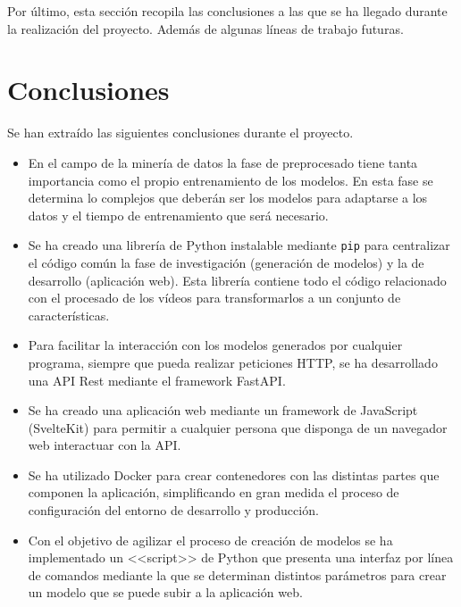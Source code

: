 \label{cha:Conclusiones y Líneas de trabajo futuras}

Por último, esta sección recopila las conclusiones a las que se ha llegado
durante la realización del proyecto. Además de algunas líneas de trabajo
futuras.

\section{Conclusiones}

Se han extraído las siguientes conclusiones durante el proyecto.

\begin{itemize}
    \item En el campo de la minería de datos la fase de preprocesado tiene tanta
    importancia como el propio entrenamiento de los modelos. En esta fase se
    determina lo complejos que deberán ser los modelos para adaptarse a los
    datos y el tiempo de entrenamiento que será necesario.
    \item Se ha creado una librería de Python instalable mediante \texttt{pip}
    para centralizar el código común la fase de investigación (generación de
    modelos) y la de desarrollo (aplicación web). Esta librería contiene todo el
    código relacionado con el procesado de los vídeos para transformarlos a un
    conjunto de características.
    \item Para facilitar la interacción con los modelos generados por cualquier
    programa, siempre que pueda realizar peticiones HTTP, se ha desarrollado una
    API Rest mediante el framework FastAPI.
    \item Se ha creado una aplicación web mediante un framework de JavaScript
    (SvelteKit) para permitir a cualquier persona que disponga de un navegador
    web interactuar con la API.
    \item Se ha utilizado Docker para crear contenedores con las distintas
    partes que componen la aplicación, simplificando en gran medida el proceso
    de configuración del entorno de desarrollo y producción.
    \item Con el objetivo de agilizar el proceso de creación de modelos se ha
    implementado un <<script>> de Python que presenta una interfaz por línea de
    comandos mediante la que se determinan distintos parámetros para crear un
    modelo que se puede subir a la aplicación web.
\end{itemize}


